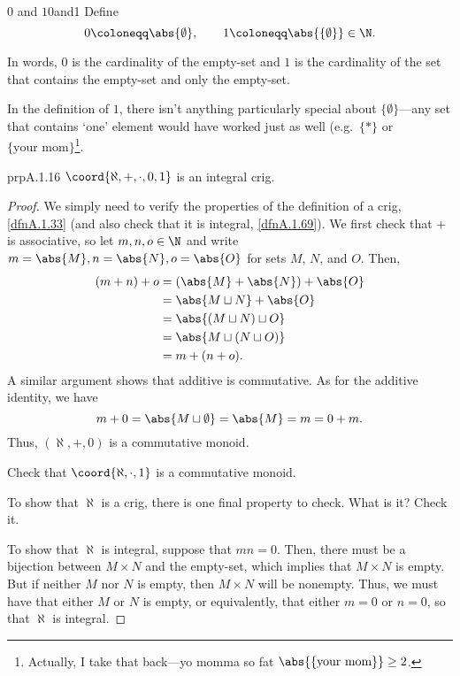 \begin{dfn}{$0$ and $1$}{0and1}
Define
\begin{equation}
0\coloneqq \abs{\emptyset},\qquad 1\coloneqq \abs{\{ \emptyset \}}\in \N .
\end{equation}
\begin{rmk}
In words, $0$ is the cardinality of the empty-set and $1$ is the cardinality of the set that contains the empty-set and only the empty-set.
\end{rmk}
\begin{rmk}
In the definition of $1$, there isn't anything particularly special about $\{ \emptyset \}$---any set that contains `one' element would have worked just as well (e.g.~$\{ *\}$ or $\{ \text{your mom}\}$\footnote{Actually, I take that back---yo momma so fat $\abs{\{ \text{your mom}\}}\geq 2$.}.
\end{rmk}
\end{dfn}
\begin{prp}{}{prpA.1.16}
$\coord{\aleph ,+,\cdot ,0,1}$ is an integral crig.
\begin{proof}
We simply need to verify the properties of the definition of a crig, \cref{dfnA.1.33} (and also check that it is integral, \cref{dfnA.1.69}).  We first check that $+$ is associative, so let $m,n,o\in \N$ and write $m=\abs{M},n=\abs{N},o=\abs{O}$ for sets $M$, $N$, and $O$.  Then,
\begin{equation}
\begin{split}
(m+n)+o & =\left( \abs{M}+\abs{N}\right) +\abs{O} \\
& =\abs{M\sqcup N}+\abs{O} \\
& =\abs{(M\sqcup N)\sqcup O} \\
& =\abs{M\sqcup (N\sqcup O)} \\
& =m+(n+o).
\end{split}
\end{equation}
A similar argument shows that additive is commutative.  As for the additive identity, we have
\begin{equation}
m+0=\abs{M\sqcup \emptyset}=\abs{M}=m=0+m.
\end{equation}
Thus, $(\aleph ,+,0)$ is a commutative monoid.

\begin{exr}[breakable=false]{}{}
Check that $\coord{\aleph ,\cdot ,1}$ is a commutative monoid.
\end{exr}
\begin{exr}[breakable=false]{}{}
To show that $\aleph$ is a crig, there is one final property to check.  What is it?  Check it.
\end{exr}

To show that $\aleph$ is integral, suppose that $mn=0$.  Then, there must be a bijection between $M\times N$ and the empty-set, which implies that $M\times N$ is empty.  But if neither $M$ nor $N$ is empty, then $M\times N$ will be nonempty.  Thus, we must have that either $M$ or $N$ is empty, or equivalently, that either $m=0$ or $n=0$, so that $\aleph$ is integral.
\end{proof}
\end{prp}

